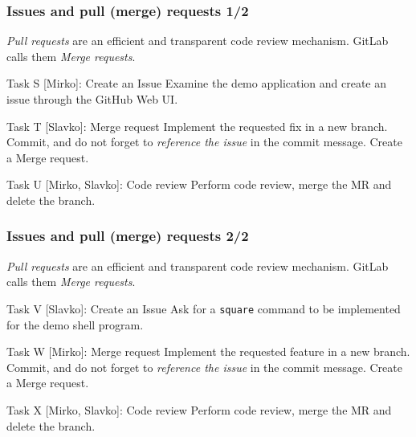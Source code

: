 \begin{frame}[fragile]
	
\frametitle{Issues and pull (merge) requests 1/2}

\emph{Pull requests} are an efficient and transparent code review mechanism. GitLab calls them \emph{Merge requests}.

\begin{block}{Task S [Mirko]: Create an Issue}
Examine the demo application and create an issue through the GitHub Web UI.
\end{block}

\begin{block}{Task T [Slavko]: Merge request}
Implement the requested fix in a new branch. Commit, and do not forget to \emph{reference the issue} in the commit message. Create a Merge request.
\end{block}	

\begin{block}{Task U [Mirko, Slavko]: Code review}
Perform code review, merge the MR and delete the branch.
\end{block}


\end{frame}


\begin{frame}[fragile]

\frametitle{Issues and pull (merge) requests 2/2}

\emph{Pull requests} are an efficient and transparent code review mechanism. GitLab calls them \emph{Merge requests}.

\begin{block}{Task V [Slavko]: Create an Issue}
Ask for a \texttt{square} command to be implemented for the demo shell program.
\end{block}

\begin{block}{Task W [Mirko]: Merge request}
Implement the requested feature in a new branch. Commit, and do not forget to \emph{reference the issue} in the commit message. Create a Merge request.
\end{block}

\begin{block}{Task X [Mirko, Slavko]: Code review}
Perform code review, merge the MR and delete the branch.
\end{block}	


\end{frame}

